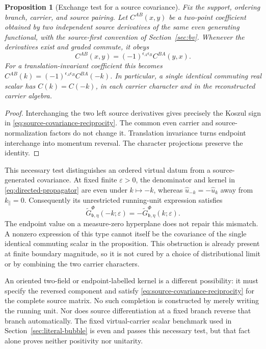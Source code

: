 \documentclass[final,5p,times,twocolumn,numbers,nopreprintline]{elsarticle}
\numberwithin{equation}{section}
\newtheorem{proposition}[theorem]{Proposition}
\theoremstyle{definition}
\theoremstyle{remark}
\newcommand{\bb}{\mathfrak b}
\newcommand{\Ph}{\Phi}
\begin{document}
\begin{proposition}[Exchange test for a source covariance]
\label{prop:source-exchange}
Fix the support, ordering branch, carrier, and source pairing. Let
\(C^{AB}(x,y)\) be a two-point coefficient obtained by two
independent source derivatives of the same even generating
functional, with the source-first convention of
Section~\ref{sec:bv}. Whenever the derivatives exist and graded
commute, it obeys
\begin{equation}
 C^{AB}(x,y)=(-1)^{\epsilon_A\epsilon_B}C^{BA}(y,x).
 \label{eq:source-covariance-reciprocity}
\end{equation}
For a translation-invariant coefficient this becomes
\(C^{AB}(k)=(-1)^{\epsilon_A\epsilon_B}C^{BA}(-k)\).
In particular, a single identical commuting real scalar has
\(C(k)=C(-k)\), in each carrier character and in the reconstructed
carrier algebra.
\end{proposition}

\begin{proof}
Interchanging the two left source derivatives gives precisely the
Koszul sign in \eqref{eq:source-covariance-reciprocity}.
The common even carrier and source-normalization factors do not
change it. Translation invariance turns endpoint interchange into
momentum reversal. The character projections preserve the identity.
\end{proof}

This necessary test distinguishes an ordered virtual datum from a
source-generated covariance. At fixed finite \(\varepsilon>0\),
the denominator and kernel in \eqref{eq:directed-propagator} are
even under \(k\mapsto-k\), whereas
\(\widehat u_{-k}=-\widehat u_k\) away from
\(k_\parallel=0\). Consequently its unrestricted running-unit
expression satisfies
\begin{equation}
 \widetilde G^\Ph_{\bb,\eta}(-k;\varepsilon)
       =-\widetilde G^\Ph_{\bb,\eta}(k;\varepsilon).
 \label{eq:running-line-reversal}
\end{equation}
The endpoint value on a measure-zero hyperplane does not repair
this mismatch. A nonzero expression of this type cannot itself be
the covariance of the single identical commuting scalar in the
proposition. This obstruction is already present at finite boundary
magnitude, so it is not cured by a choice of distributional limit
or by combining the two carrier characters.

An oriented two-field or endpoint-labelled kernel is a different
possibility: it must specify the reversed component and satisfy
\eqref{eq:source-covariance-reciprocity} for the complete source
matrix. No such completion is constructed by merely writing the
running unit. Nor does source differentiation at a fixed branch
reverse that branch automatically. The fixed virtual-carrier scalar
benchmark used in Section~\ref{sec:literal-bubble} is even and
passes this necessary test, but that fact alone proves neither
positivity nor unitarity.
\end{document}
